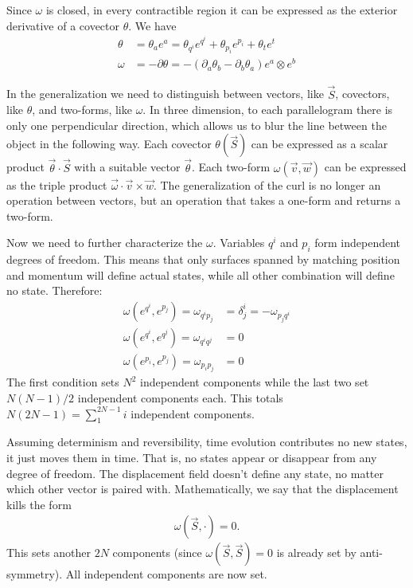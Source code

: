 \documentclass[10pt,twocolumn, nofootinbib]{revtex4-2}
\begin{document}
Since $\omega$ is closed, in every contractible region it can be expressed as the exterior derivative of a covector $\theta$. We have
\begin{equation}
\begin{aligned}
	\theta &= \theta_a e^a = \theta_{q^i} e^{q^i} + \theta_{p_i} e^{p_i} + \theta_t e^t \\
	\omega &= - \partial \theta = - \left( \partial_a \theta_b - \partial_b \theta_a \right) e^a \otimes e^b
\end{aligned}
\end{equation}

In the generalization we need to distinguish between vectors, like $\vec{S}$, covectors, like $\theta$, and two-forms, like $\omega$. In three dimension, to each parallelogram there is only one perpendicular direction, which allows us to blur the line between the object in the following way. Each covector $\theta(\vec{S})$ can be expressed as a scalar product $\vec{\theta} \cdot \vec{S}$ with a suitable vector $\vec{\theta}$. Each two-form $\omega(\vec{v}, \vec{w})$ can be expressed as the triple product $\vec{\omega} \cdot \vec{v} \times \vec{w}$. The generalization of the curl is no longer an operation between vectors, but an operation that takes a one-form and returns a two-form.

Now we need to further characterize the $\omega$. Variables $q^i$ and $p_i$ form independent degrees of freedom. This means that only surfaces spanned by matching position and momentum will define actual states, while all other combination will define no state. Therefore:
\begin{equation}\label{canonical_conditions}
\begin{aligned}
	\omega(e^{q^i}, e^{p_j}) = \omega_{q^i p_j} &= \delta^i_j = - \omega_{p_j q^i} \\
	\omega(e^{q^i}, e^{q^j}) = \omega_{q^i q^j} &= 0 \\
	\omega(e^{p_i}, e^{p_j}) = \omega_{p_i p_j} &= 0
\end{aligned}
\end{equation}
The first condition sets $N^2$ independent components while the last two set $N(N-1)/2$ independent components each. This totals $N(2N-1) = \sum_1^{2N-1}i$ independent components.

Assuming determinism and reversibility, time evolution contributes no new states, it just moves them in time. That is, no states appear or disappear from any degree of freedom. The displacement field doesn't define any state, no matter which other vector is paired with. Mathematically, we say that the displacement kills the form
\begin{align}\label{mdof_displacement_kills}
	\omega(\vec{S}, \cdot) = 0.
\end{align}
This sets another $2N$ components (since $\omega(\vec{S}, \vec{S}) = 0$ is already set by anti-symmetry). All independent components are now set.
\end{document}
